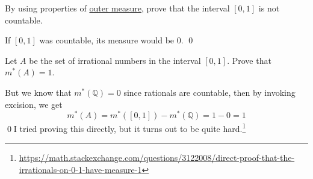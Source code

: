   \begin{exercise}[Royden 2.5]
    By using properties of \hyperref[def:outer-measure]{outer measure}, prove that the interval $[0, 1]$ is not countable.
  \end{exercise}
  \begin{solution}
    If $[0, 1]$ was countable, its measure would be $0$. \qed
  \end{solution}

  \begin{exercise}[Royden 2.6]
    Let $A$ be the set of irrational numbers in the interval $[0, 1]$. Prove that $m^{\ast}(A) = 1$.
  \end{exercise}
  \begin{solution}
    But we know that $m^\ast (\mathbb{Q}) = 0$ since rationals are countable, then by invoking excision, we get 
    \begin{equation}
      m^\ast (A) = m^\ast ([0, 1]) - m^\ast(\mathbb{Q}) = 1 - 0 = 1
    \end{equation}
    \qed I tried proving this directly, but it turns out to be quite hard.\footnote{\href{https://math.stackexchange.com/questions/3122008/direct-proof-that-the-irrationals-on-0-1-have-measure-1}{https://math.stackexchange.com/questions/3122008/direct-proof-that-the-irrationals-on-0-1-have-measure-1}}
  \end{solution}

